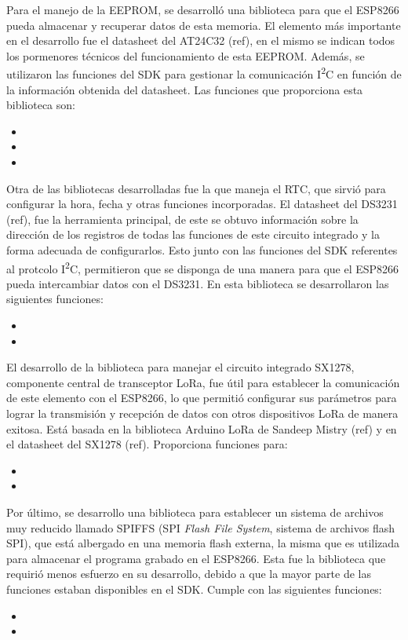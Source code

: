 Para el manejo de la EEPROM, se desarrolló una biblioteca para que el ESP8266 pueda almacenar y recuperar datos de esta memoria. El elemento más importante en el desarrollo fue el datasheet del AT24C32 (ref), en el mismo se indican todos los pormenores técnicos del funcionamiento de esta EEPROM. Además, se utilizaron las funciones del SDK para gestionar la comunicación I\textsuperscript{2}C en función de la información obtenida del datasheet. Las funciones que proporciona esta biblioteca son:

\begin{itemize}
	\item
	\item
	\item
\end{itemize}

Otra de las bibliotecas desarrolladas fue la que maneja el RTC, que sirvió para configurar la hora, fecha y otras funciones incorporadas. El datasheet del DS3231 (ref), fue la herramienta principal, de este se obtuvo información sobre la dirección de los registros de todas las funciones de este circuito integrado y la forma adecuada de configurarlos. Esto junto con las funciones del SDK referentes al protcolo I\textsuperscript{2}C, permitieron que se disponga de una manera para que el ESP8266 pueda intercambiar datos con el DS3231. En esta biblioteca se desarrollaron las siguientes funciones:

\begin{itemize}
	\item
	\item
\end{itemize}

El desarrollo de la biblioteca para manejar el circuito integrado SX1278, componente central de transceptor LoRa, fue útil para establecer la comunicación de este elemento con el ESP8266, lo que permitió configurar sus parámetros para lograr la transmisión y recepción de datos con otros dispositivos LoRa de manera exitosa. Está basada en la biblioteca Arduino LoRa de Sandeep Mistry (ref) y en el datasheet del SX1278 (ref). Proporciona funciones para:

\begin{itemize}
	\item
	\item
\end{itemize}

Por último, se desarrollo una biblioteca para establecer un sistema de archivos muy reducido llamado SPIFFS (SPI \textit{Flash File System}, sistema de archivos flash SPI), que está albergado en una memoria flash externa, la misma que es utilizada para almacenar el programa grabado en el ESP8266. Esta fue la biblioteca que requirió menos esfuerzo en su desarrollo, debido a que la mayor parte de las funciones estaban disponibles en el SDK. Cumple con las siguientes funciones:
\begin{itemize}
	\item
	\item
\end{itemize}

